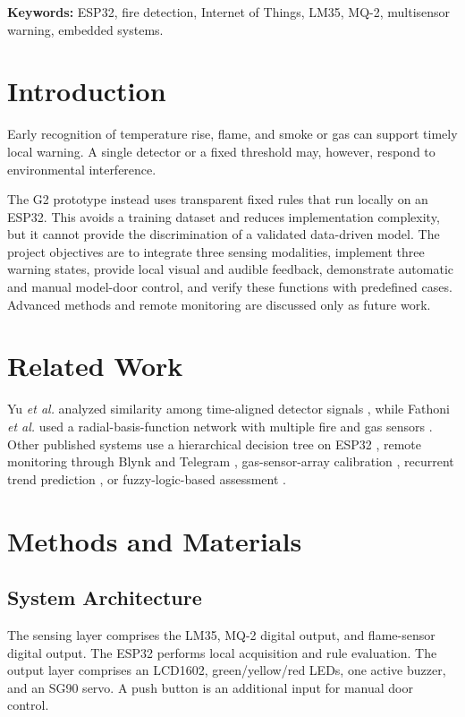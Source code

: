 \documentclass[12pt,a4paper]{article}
\begin{document}
\noindent\textbf{Keywords:} ESP32, fire detection, Internet of Things, LM35, MQ-2, multisensor warning, embedded systems.

\section{Introduction}
Early recognition of temperature rise, flame, and smoke or gas can support timely local warning. A single detector or a fixed threshold may, however, respond to environmental interference.

The G2 prototype instead uses transparent fixed rules that run locally on an ESP32. This avoids a training dataset and reduces implementation complexity, but it cannot provide the discrimination of a validated data-driven model. The project objectives are to integrate three sensing modalities, implement three warning states, provide local visual and audible feedback, demonstrate automatic and manual model-door control, and verify these functions with predefined cases. Advanced methods and remote monitoring are discussed only as future work.

\section{Related Work}
Yu \emph{et al.} analyzed similarity among time-aligned detector signals \cite{yu2023multidetector}, while Fathoni \emph{et al.} used a radial-basis-function network with multiple fire and gas sensors \cite{fathoni2025multisensor}. Other published systems use a hierarchical decision tree on ESP32 \cite{purba2026smartsafety}, remote monitoring through Blynk and Telegram \cite{ramadani2026blynk}, gas-sensor-array calibration \cite{solorzano2022gas}, recurrent trend prediction \cite{nakip2021rtpnn}, or fuzzy-logic-based assessment \cite{rehman2021smartfire}.

\section{Methods and Materials}

\subsection{System Architecture}
The sensing layer comprises the LM35, MQ-2 digital output, and flame-sensor digital output. The ESP32 performs local acquisition and rule evaluation. The output layer comprises an LCD1602, green/yellow/red LEDs, one active buzzer, and an SG90 servo. A push button is an additional input for manual door control.
\end{document}
